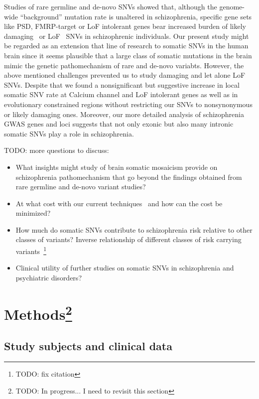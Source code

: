 \documentclass[letterpaper]{article}
\begin{document}
Studies of rare germline and de-novo SNVs showed that, although the
genome-wide ``background'' mutation rate is unaltered in schizophrenia,
specific gene sets like PSD, FMRP-target or LoF intolerant genes bear
increased burden of likely damaging~\citep{Purcell2014} or
LoF~\citep{Singh2017} SNVs in schizophrenic individuals.  Our present study
might be regarded as an extension that line of research to somatic SNVs in the
human brain since it seems plausible that a large class of somatic mutations
in the brain mimic the genetic pathomechanism of rare and de-novo variabts.
However, the above mentioned challenges prevented us to study damaging and let
alone LoF SNVs.  Despite that we found a nonsignificant but suggestive
increase in local somatic SNV rate at Calcium channel and LoF intolerant genes
as well as in evolutionary constrained regions without restricting our SNVs to
nonsynonymous or likely damaging ones.  Moreover, our more detailed analysis
of schizophrenia GWAS genes and loci suggests that not only exonic but also
many intronic somatic SNVs play a role in schizophrenia.

TODO: more questions to discuss:
\begin{itemize}
\item What insights might study of brain somatic mosaicism provide on schizophrenia
pathomechanism that go beyond the findings obtained from rare germline and
de-novo variant studies?  
\item At what cost with our current techniques~\citep{Wang2021} and how can the cost be minimized?  
\item How much do somatic SNVs contribute to schizophrenia risk relative to other
classes of variants?  Inverse relationship of different classes of risk
carrying variants~\citep{Bergen2019}\footnote{TODO: fix citation}
\item Clinical utility of further studies on somatic SNVs in
schizophrenia and psychiatric disorders?
\end{itemize}


\section*{Methods\footnote{TODO: In progress... I need to revisit this section}}

\subsection*{Study subjects and clinical data}
\end{document}
